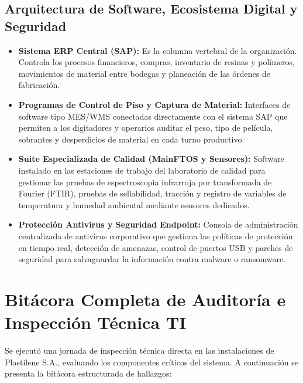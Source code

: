 		\subsection{Arquitectura de Software, Ecosistema Digital y Seguridad}
		\begin{itemize}
			\item \textbf{Sistema ERP Central (SAP):} Es la columna vertebral de la organización. Controla los procesos financieros, compras, inventario de resinas y polímeros, movimientos de material entre bodegas y planeación de las órdenes de fabricación.
			\item \textbf{Programas de Control de Piso y Captura de Material:} Interfaces de software tipo MES/WMS conectadas directamente con el sistema SAP que permiten a los digitadores y operarios auditar el peso, tipo de película, sobrantes y desperdicios de material en cada turno productivo.
			\item \textbf{Suite Especializada de Calidad (MainFTOS y Sensores):} Software instalado en las estaciones de trabajo del laboratorio de calidad para gestionar las pruebas de espectroscopia infrarroja por transformada de Fourier (FTIR), pruebas de sellabilidad, tracción y registro de variables de temperatura y humedad ambiental mediante sensores dedicados.
			\item \textbf{Protección Antivirus y Seguridad Endpoint:} Consola de administración centralizada de antivirus corporativo que gestiona las políticas de protección en tiempo real, detección de amenazas, control de puertos USB y parches de seguridad para salvaguardar la información contra malware o ransomware.
		\end{itemize}
		
	\section{Bitácora Completa de Auditoría e Inspección Técnica TI}
		Se ejecutó una jornada de inspección técnica directa en las instalaciones de Plastilene S.A., evaluando los componentes críticos del sistema. A continuación se presenta la bitácora estructurada de hallazgos:
		
